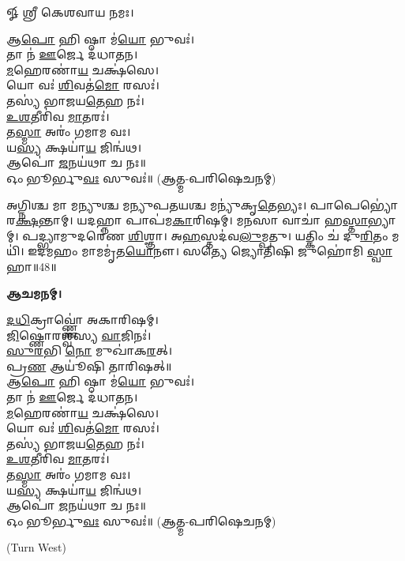 
𑍐 𑌶𑍍𑌰𑍀 𑌕𑍇𑌶𑌵𑌾𑌯 𑌨𑌮𑌃।

𑌆\ul{𑌪𑍋} 𑌹𑌿 𑌷𑍍𑌠𑌾 𑌮॑\ul{𑌯𑍋} 𑌭𑍁𑌵𑌃॑।\\
𑌤𑌾 𑌨॑ \ul{𑌊}𑌰𑍍𑌜𑍇 𑌦॑𑌧𑌾𑌤𑌨।\\
\ul{𑌮}𑌹𑍇𑌰𑌣𑌾॑\ul{𑌯} 𑌚𑌕𑍍𑌷॑𑌸𑍇।\\
𑌯𑍋 𑌵𑌃॑ \ul{𑌶𑌿}𑌵𑌤॑\ul{𑌮𑍋} 𑌰𑌸𑌃॑।\\
𑌤𑌸𑍍𑌯॑ 𑌭𑌾𑌜𑌯\ul{𑌤𑍇}𑌹 𑌨𑌃॑।\\
\ul{𑌉}\ul{𑌶}𑌤𑍀𑌰𑌿॑𑌵 \ul{𑌮𑌾}𑌤𑌰𑌃॑।\\
𑌤\ul{𑌸𑍍𑌮𑌾} 𑌅𑌰𑌂॑ 𑌗𑌮𑌾𑌮 𑌵𑌃।\\
𑌯\ul{𑌸𑍍𑌯} 𑌕𑍍𑌷𑌯𑌾॑\ul{𑌯} 𑌜𑌿𑌨𑍍𑌵॑𑌥।\\
𑌆𑌪𑍋॑ \ul{𑌜}𑌨𑌯॑𑌥𑌾 𑌚 𑌨𑌃॥\\

𑌓𑌂 𑌭𑍂𑌰𑍍𑌭𑍁\ul{𑌵𑌃} 𑌸𑍁𑌵𑌃॑॥ (𑌆𑌤𑍍𑌮-𑌪𑌰𑌿𑌷𑍇𑌚𑌨𑌮𑍍)


𑌅𑌗𑍍𑌨𑌿𑌶𑍍𑌚 𑌮𑌾 𑌮𑌨𑍍𑌯𑍁𑌶𑍍𑌚 𑌮𑌨𑍍𑌯𑍁𑌪𑌤𑌯𑌶𑍍𑌚 𑌮𑌨𑍍𑌯𑍁॑𑌕𑍃\ul{𑌤𑍇}𑌭𑍍𑌯𑌃। 𑌪𑌾𑌪𑍇𑌭𑍍𑌯𑍋॑ 𑌰\ul{𑌕𑍍𑌷}𑌨𑍍𑌤𑌾𑌮𑍍। 𑌯𑌦𑌹𑍍𑌨𑌾 𑌪𑌾𑌪॑𑌮\ul{𑌕𑌾}𑌰𑌿𑌷𑌮𑍍। 𑌮𑌨𑌸𑌾 𑌵𑌾𑌚𑌾॑ 𑌹\ul{𑌸𑍍𑌤𑌾}𑌭𑍍𑌯𑌾𑌮𑍍। 𑌪𑌦𑍍𑌭𑍍𑌯𑌾𑌮𑍁𑌦𑌰𑍇॑𑌣 \ul{𑌶𑌿}𑌶𑍍𑌞𑌾। 𑌅\ul{𑌹}𑌸𑍍𑌤𑌦॑𑌵\ul{𑌲𑍁}𑌮𑍍𑌪𑌤𑍁। 𑌯𑌤𑍍𑌕𑌿𑌂 𑌚॑ 𑌦𑍁\ul{𑌰𑌿}𑌤𑌂 𑌮𑌯𑌿॑। 𑌇𑌦𑌮𑌹𑌂 𑌮𑌾𑌮𑌮𑍃॑𑌤\ul{𑌯𑍋}𑌨𑍗। 𑌸𑌤𑍍𑌯𑍇 𑌜𑍍𑌯𑍋𑌤𑌿𑌷𑌿 𑌜𑍁𑌹𑍋॑𑌮𑌿 \ul{𑌸𑍍𑌵𑌾}𑌹𑌾॥48॥


\textbf{𑌆𑌚𑌮𑌨𑌮𑍍।}

\ul{𑌦}\ul{𑌧𑌿}𑌕𑍍𑌰𑌾𑌵𑍍𑌣𑍍𑌣𑍋॑ 𑌅𑌕𑌾𑌰𑌿𑌷𑌮𑍍।\\
 \ul{𑌜𑌿}𑌷𑍍𑌣𑍋𑌰𑌶𑍍𑌵॑𑌸𑍍𑌯 \ul{𑌵𑌾}𑌜𑌿𑌨𑌃॑।\\
\ul{𑌸𑍁}\ul{𑌰}𑌭𑌿 \ul{𑌨𑍋} 𑌮𑍁𑌖𑌾॑𑌕\ul{𑌰}𑌤𑍍।\\
𑌪𑍍𑌰\ul{𑌣} 𑌆𑌯𑍂॑𑌷𑌿 𑌤𑌾𑌰𑌿𑌷𑌤𑍍॥\\



𑌆\ul{𑌪𑍋} 𑌹𑌿 𑌷𑍍𑌠𑌾 𑌮॑\ul{𑌯𑍋} 𑌭𑍁𑌵𑌃॑।\\
𑌤𑌾 𑌨॑ \ul{𑌊}𑌰𑍍𑌜𑍇 𑌦॑𑌧𑌾𑌤𑌨।\\
\ul{𑌮}𑌹𑍇𑌰𑌣𑌾॑\ul{𑌯} 𑌚𑌕𑍍𑌷॑𑌸𑍇।\\
𑌯𑍋 𑌵𑌃॑ \ul{𑌶𑌿}𑌵𑌤॑\ul{𑌮𑍋} 𑌰𑌸𑌃॑।\\
𑌤𑌸𑍍𑌯॑ 𑌭𑌾𑌜𑌯\ul{𑌤𑍇}𑌹 𑌨𑌃॑।\\
\ul{𑌉}\ul{𑌶}𑌤𑍀𑌰𑌿॑𑌵 \ul{𑌮𑌾}𑌤𑌰𑌃॑।\\
𑌤\ul{𑌸𑍍𑌮𑌾} 𑌅𑌰𑌂॑ 𑌗𑌮𑌾𑌮 𑌵𑌃।\\
𑌯\ul{𑌸𑍍𑌯} 𑌕𑍍𑌷𑌯𑌾॑\ul{𑌯} 𑌜𑌿𑌨𑍍𑌵॑𑌥।\\
𑌆𑌪𑍋॑ \ul{𑌜}𑌨𑌯॑𑌥𑌾 𑌚 𑌨𑌃॥\\

𑌓𑌂 𑌭𑍂𑌰𑍍𑌭𑍁\ul{𑌵𑌃} 𑌸𑍁𑌵𑌃॑॥ (𑌆𑌤𑍍𑌮-𑌪𑌰𑌿𑌷𑍇𑌚𑌨𑌮𑍍)


{\scriptsize (Turn West)}


